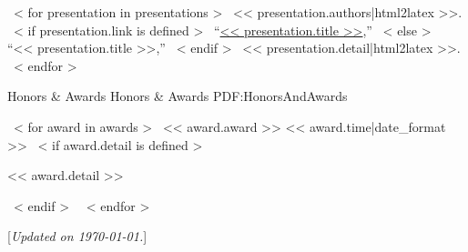 \documentclass[letterpaper,MMMyyyy,nonstopmode]{simpleresumecv}
\newcommand{\CVNote}{Updated on {\today}.}
\begin{document}
\begin{Body}
~< for presentation in presentations >~
    \Entry
    << presentation.authors|html2latex >>.
    ~< if presentation.link is defined >~
        ``\href{<< presentation.link >>}{<< presentation.title >>},''
    ~< else >~
        ``<< presentation.title >>,''
    ~< endif >~
    << presentation.detail|html2latex >>.
    \Gap
~< endfor >~


\Section
{Honors \& Awards}
{Honors \& Awards}
{PDF:HonorsAndAwards}

~< for award in awards >~
    \BulletItem
    << award.award >>
    \hfill
    << award.time|date_format >>
    ~< if award.detail is defined >~
        \begin{Detail}
        \Item
        << award.detail >>
        \end{Detail}
    ~< endif >~
    \Gap
~< endfor >~

\end{Body}


\BigGap
\UseNoteFont%
\null\hfill%
[\textit{\CVNote}]
\end{document}
